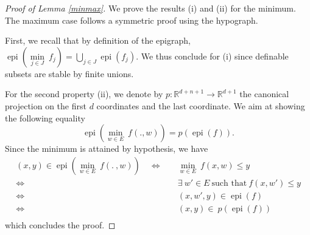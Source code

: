 \documentclass[10pt,a4paper]{amsart}
\DeclareMathOperator{\epi}{epi}
\begin{document}
\begin{proof}[Proof of Lemma \ref{minmax}]

We prove the results (i) and (ii) for the minimum. The maximum case follows a symmetric proof using the hypograph.

First, we recall that by definition of the epigraph, $\epi \left( \underset{j\in J }{\min} \:f_{j}\right)=\bigcup_{j\in J}\epi(f_{j})$. We thus conclude for (i) since definable subsets are stable by finite unions.

For the second property (ii), we denote by $p:\mathbb{R}^{d+n+1}\longrightarrow \mathbb{R}^{d+1}$ the canonical projection on the first $d$ coordinates and the last coordinate. We aim at showing the following equality
\begin{equation*}
\epi\left(\underset{w\in E}{\min}\:f(.,w)\right)=p\left(\epi(f)\right).
\end{equation*}
Since the minimum is attained by hypothesis, we have
\begin{align*}
(x,y)\in \epi\left(\underset{w\in E}{\min}\: f(.\:,w)\right)
\quad\iff \quad & \underset{w\in E}{\min}\:f(x,w)\leq y\\
\iff \quad & \exists \ w'\in E\ \text{such that}\ f(x,w')\leq y\\
\iff \quad & (x,w',y)\in \epi(f)\\
\iff \quad & (x,y)\in \ p(\epi(f))\\
\end{align*}
which concludes the proof.

\end{proof}
\end{document}
